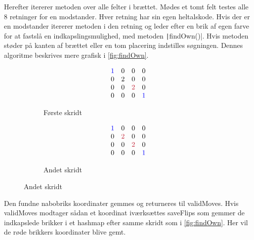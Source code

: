 Herefter itererer metoden over alle felter i brættet. Mødes et tomt felt testes alle 8 retninger for en modstander. Hver retning har sin egen heltalskode. Hvis der er en modstander itererer metoden i den retning og leder efter en brik af egen farve for at fastslå en indkapslingsmulighed, med metoden \texttt|findOwn()|. Hvis metoden støder på kanten af brættet eller en tom placering indstilles søgningen. Dennes algoritme beskrives mere grafisk i \cref{fig:findOwn}.
\begin{figure}[H]
    \centering
    \caption{\texttt|findOwn()| leder efter en indkapsling i nordvestlig retning (heltalskode 1).}\label{fig:findOwn}
    \begin{subfigure}[t]{.3\textwidth}
        \caption{Første skridt}
        \begin{align*}
            \begin{array}{cccc}
                \color{blue}1 & 0 & 0               & 0             \\
                0             & 2 & 0               & 0             \\
                0             & 0 & \color{DTUred}2 & 0             \\
                0             & 0 & 0               & \color{blue}1
            \end{array}
        \end{align*}
    \end{subfigure}
    \quad
    \begin{subfigure}[t]{.3\textwidth}
        \caption{Andet skridt}
        \begin{align*}
            \begin{array}{cccc}
                \color{blue}1 & 0               & 0               & 0             \\
                0             & \color{DTUred}2 & 0               & 0             \\
                0             & 0               & \color{DTUred}2 & 0             \\
                0             & 0               & 0               & \color{blue}1
            \end{array}
        \end{align*}
    \end{subfigure}
\end{figure}
Den fundne nabobriks koordinater gemmes og returneres til validMoves. Hvis validMoves modtager sådan et koordinat iværksættes saveFlips som gemmer de indkapslede brikker i et hashmap efter samme skridt som i \cref{fig:findOwn}. Her vil de røde brikkers koordinater blive gemt.\newline

